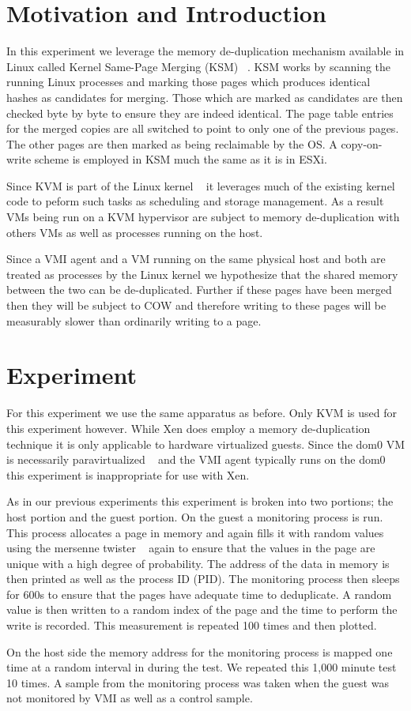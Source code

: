 
\section{Motivation and Introduction}

In this experiment we leverage the memory de-duplication mechanism available in Linux called Kernel Same-Page Merging (KSM) ~\cite{arcangeli_increasing_2009}. KSM works by scanning the running Linux processes and marking those pages which produces identical hashes as candidates for merging. Those which are marked as candidates are then checked byte by byte to ensure they are indeed identical. The page table entries for the merged copies are all switched to point to only one of the previous pages. The other pages are then marked as being reclaimable by the OS. A copy-on-write scheme is employed in KSM much the same as it is in ESXi. 


Since KVM is part of the Linux kernel ~\cite{_Linux_archive} it leverages much of the existing kernel code to peform such tasks as scheduling and storage management. As a result VMs being run on a KVM hypervisor are subject to memory de-duplication with others VMs as well as processes running on the host. 


Since a VMI agent and a VM running on the same physical host and both are treated as processes by the Linux kernel we hypothesize that the shared memory between the two can be de-duplicated. Further if these pages have been merged then they will be subject to COW and therefore writing to these pages will be measurably slower than ordinarily writing to a page. 

\section{Experiment}

For this experiment we use the same apparatus as before. Only KVM is used for this experiment however. While Xen does employ a memory de-duplication technique it is only applicable to hardware virtualized guests. Since the dom0 VM is necessarily paravirtualized ~\cite{barham_xen_2003} and the VMI agent typically runs on the dom0 this experiment is inappropriate for use with Xen. 

As in our previous experiments this experiment is broken into two portions; the host portion and the guest portion. On the guest a monitoring process is run. This process allocates a page in memory and again fills it with random values using the mersenne twister ~\cite{matsumoto_mersenne_1998} again to ensure that the values in the page are unique with a high degree of probability. The address of the data in memory is then printed as well as the process ID (PID). The monitoring process then sleeps for 600s to ensure that the pages have adequate time to deduplicate. A random value is then written to a random index of the page and the time to perform the write is recorded. This measurement is repeated 100 times and then plotted. 

On the host side the memory address for the monitoring process is mapped one time at a random interval in during the test. We repeated this 1,000 minute test 10 times. A sample from the monitoring process was taken when the guest was not monitored by VMI as well as a control sample.
